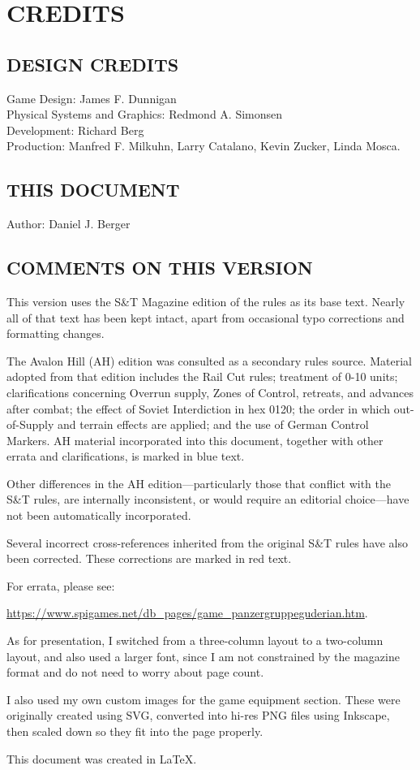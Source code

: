 \section{CREDITS}

\subsection{DESIGN CREDITS}

Game Design: James F. Dunnigan\\
Physical Systems and Graphics: Redmond A. Simonsen\\
Development: Richard Berg\\
Production: Manfred F. Milkuhn, Larry Catalano, Kevin Zucker, Linda Mosca.

\subsection{THIS DOCUMENT}

Author: Daniel J. Berger

\subsection{COMMENTS ON THIS VERSION}

This version uses the S\&T Magazine edition of the rules as its base text. Nearly all of that text has been kept intact, apart from occasional typo corrections and formatting changes.

The Avalon Hill (AH) edition was consulted as a secondary rules source. Material adopted from that edition includes the Rail Cut rules; treatment of 0-10 units; clarifications concerning Overrun supply, Zones of Control, retreats, and advances after combat; the effect of Soviet Interdiction in hex 0120; the order in which out-of-Supply and terrain effects are applied; and the use of German Control Markers. AH material incorporated into this document, together with other errata and clarifications, is marked in blue text.

Other differences in the AH edition---particularly those that conflict with the S\&T rules, are internally inconsistent, or would require an editorial choice---have not been automatically incorporated.

Several incorrect cross-references inherited from the original S\&T rules have also been corrected. These corrections are marked in red text.

For errata, please see:

\url{https://www.spigames.net/db_pages/game_panzergruppeguderian.htm}.

As for presentation, I switched from a three-column layout to a two-column layout, and also used a larger font, since I am not constrained by the magazine format and do not need to worry about page count.

I also used my own custom images for the game equipment section. These were originally created using SVG, converted into hi-res PNG files using Inkscape, then scaled down so they fit into the page properly.

This document was created in LaTeX.
